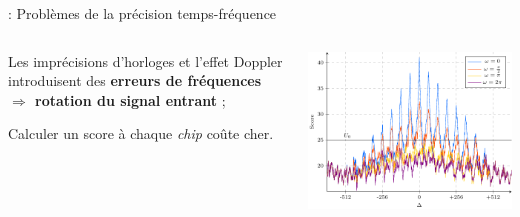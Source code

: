 \documentclass[../main.tex]{subfiles}
\begin{document}

\begin{frame}{\subsecname : {Problèmes de la précision temps-fréquence}}
  \begin{columns}
    \begin{column}{.4\linewidth}
      \begin{ctrlitemize}{8pt}
        \item Les imprécisions d'horloges et l'effet Doppler introduisent des \textbf{erreurs de fréquences} \textbf{$\Rightarrow$ rotation du signal entrant} ;
        \item Calculer un score à chaque \textit{chip} coûte cher.
      \end{ctrlitemize}
    \end{column}
    \begin{column}{.6\linewidth}
      \centering
      \includegraphics[width=\linewidth, height=.75\textheight, keepaspectratio=true]{figures/pgfplots/score_function_stdl.pdf}
    \end{column}
  \end{columns}
\end{frame}
\end{document}

